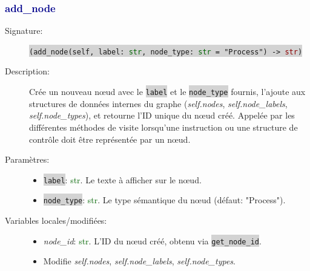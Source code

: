 \documentclass[11pt,a4paper]{article}
\newcommand{\code}[1]{\colorbox{lightgray}{\texttt{\small #1}}}
\newcommand{\var}[1]{\textit{#1}}
\newcommand{\vartype}[1]{\textcolor{darkgreen}{#1}}
\newcommand{\methodname}[1]{\textbf{\textcolor{darkblue}{#1}}}
\newcommand{\param}[1]{\code{#1}}
\newcommand{\rettype}[1]{\textcolor{darkred}{#1}}
\begin{document}
\subsubsection*{\methodname{add\_node}}
\begin{description}
    \item[Signature:] \code{(add\_node(self, label: \vartype{str}, node\_type: \vartype{str} = "Process") -> \rettype{str})}
    \item[Description:] Crée un nouveau nœud avec le \param{label} et le \param{node\_type} fournis, l'ajoute aux structures de données internes du graphe (\var{self.nodes}, \var{self.node\_labels}, \var{self.node\_types}), et retourne l'ID unique du nœud créé. Appelée par les différentes méthodes de visite lorsqu'une instruction ou une structure de contrôle doit être représentée par un nœud.
    \item[Paramètres:]
    \begin{itemize}
        \item \param{label}: \vartype{str}. Le texte à afficher sur le nœud.
        \item \param{node\_type}: \vartype{str}. Le type sémantique du nœud (défaut: "Process").
    \end{itemize}
    \item[Variables locales/modifiées:]
    \begin{itemize}
        \item \var{node\_id}: \vartype{str}. L'ID du nœud créé, obtenu via \code{get\_node\_id}.
        \item Modifie \var{self.nodes}, \var{self.node\_labels}, \var{self.node\_types}.
    \end{itemize}
\end{description}
\end{document}
